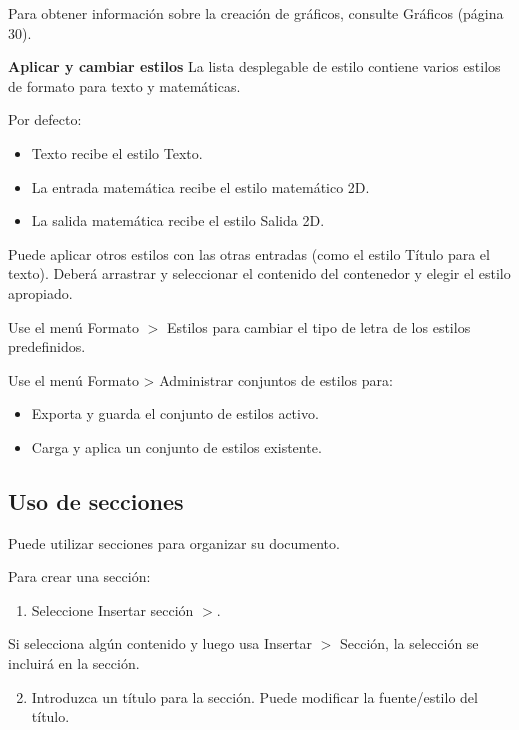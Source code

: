 Para obtener información sobre la creación de gráficos, consulte Gráficos (página 30).

\textbf{Aplicar y cambiar estilos}
La lista desplegable de estilo contiene varios estilos de formato para texto y matemáticas.


Por defecto:

\begin{itemize}
  \item Texto recibe el estilo Texto.

\item La entrada matemática recibe el estilo matemático 2D.

\item La salida matemática recibe el estilo Salida 2D.
\end{itemize}

Puede aplicar otros estilos con las otras entradas (como el estilo Título para el texto). Deberá arrastrar y seleccionar el contenido del contenedor y elegir el estilo apropiado.

Use el menú Formato $>$ Estilos para cambiar el tipo de letra de los estilos predefinidos.

Use el menú Formato > Administrar conjuntos de estilos para:

\begin{itemize}
  \item Exporta y guarda el conjunto de estilos activo.

\item Carga y aplica un conjunto de estilos existente.
\end{itemize}

\subsection{Uso de secciones}
Puede utilizar secciones para organizar su documento.

Para crear una sección:

\begin{enumerate}
  \item Seleccione Insertar sección $>$.
\end{enumerate}

Si selecciona algún contenido y luego usa Insertar $>$ Sección, la selección se incluirá en la sección.

\begin{enumerate}
	\setcounter{enumi}{1}
  \item Introduzca un título para la sección. Puede modificar la fuente/estilo del título.
\end{enumerate}

